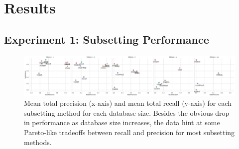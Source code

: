 




\section{Results}


\subsection{Experiment 1: Subsetting Performance}

\begin{figure}
  \centering
  \includegraphics[width=\linewidth]{figures/pareto_total_recall_precision_by_dbsize.pdf}
  \caption{Mean total precision (x-axis) and mean total recall (y-axis) for each subsetting method for each database size. Besides the obvious drop in performance as database size increases, the data hint at some Pareto-like tradeoffs between recall and precision for most subsetting methods.}
  \label{fig:pareto-total-recall-precision-by-dbsize}
\end{figure}

